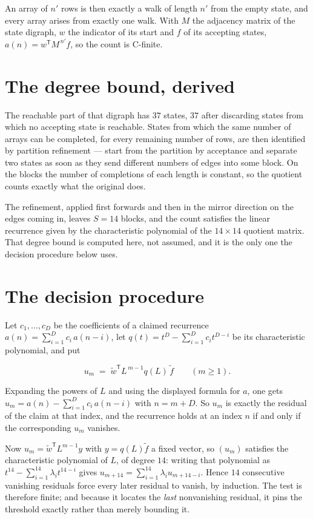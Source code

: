 \documentclass[11pt]{article}
\theoremstyle{definition}
\begin{document}
An array of $n'$ rows is then exactly a walk of length $n'$ from the empty state, and every array arises from exactly one walk. With $M$ the adjacency matrix of the state digraph, $w$ the indicator of its start and $f$ of its accepting states, $a(n) = w^{\mathsf T}M^{\,n'}f$, so the count is C-finite.

\section{The degree bound, derived}

The reachable part of that digraph has $37$ states, $37$ after discarding states from which no accepting state is reachable. States from which the same number of arrays can be completed, for every remaining number of rows, are then identified by partition refinement --- start from the partition by acceptance and separate two states as soon as they send different numbers of edges into some block. On the blocks the number of completions of each length is constant, so the quotient counts exactly what the original does.

The refinement, applied first forwards and then in the mirror direction on the edges coming in, leaves $S = 14$ blocks, and the count satisfies the linear recurrence given by the characteristic polynomial of the $14 \times 14$ quotient matrix. That degree bound is computed here, not assumed, and it is the only one the decision procedure below uses.

\section{The decision procedure}

Let $c_1,\dots,c_D$ be the coefficients of a claimed recurrence $a(n) = \sum_{i=1}^{D} c_i\,a(n-i)$, let $q(t) = t^{D} - \sum_{i=1}^{D} c_i t^{D-i}$ be its characteristic polynomial, and put

\[u_m \;=\; \tilde w^{\mathsf T} L^{\,m-1} q(L)\,\tilde f \qquad (m \ge 1).\]

Expanding the powers of $L$ and using the displayed formula for $a$, one gets $u_m = a(n) - \sum_{i=1}^{D} c_i\,a(n-i)$ with $n = m + D$. So $u_m$ is exactly the residual of the claim at that index, and the recurrence holds at an index $n$ if and only if the corresponding $u_m$ vanishes.

Now $u_m = \tilde w^{\mathsf T} L^{m-1} y$ with $y = q(L)\tilde f$ a fixed vector, so $(u_m)$ satisfies the characteristic polynomial of $L$, of degree $14$: writing that polynomial as $t^{14} - \sum_{i=1}^{14} \lambda_i t^{14-i}$ gives $u_{m+14} = \sum_{i=1}^{14} \lambda_i u_{m+14-i}$. Hence $14$ consecutive vanishing residuals force every later residual to vanish, by induction. The test is therefore finite; and because it locates the {\itshape last} nonvanishing residual, it pins the threshold exactly rather than merely bounding it.
\end{document}

